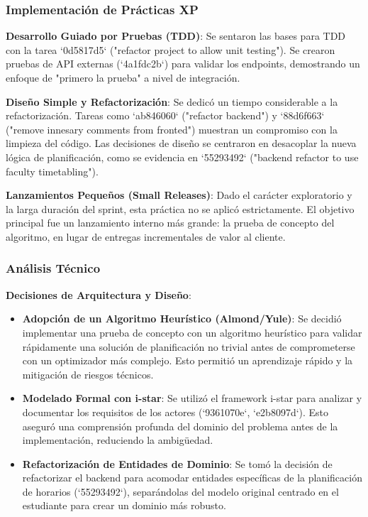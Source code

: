 \subsubsection{Implementación de Prácticas XP}

\textbf{Desarrollo Guiado por Pruebas (TDD)}:
Se sentaron las bases para TDD con la tarea `0d5817d5` ("refactor project to allow unit testing"). Se crearon pruebas de API externas (`4a1fdc2b`) para validar los endpoints, demostrando un enfoque de "primero la prueba" a nivel de integración.

\textbf{Diseño Simple y Refactorización}:
Se dedicó un tiempo considerable a la refactorización. Tareas como `ab846060` ("refactor backend") y `88d6f663` ("remove innesary comments from fronted") muestran un compromiso con la limpieza del código. Las decisiones de diseño se centraron en desacoplar la nueva lógica de planificación, como se evidencia en `55293492` ("backend refactor to use faculty timetabling").

\textbf{Lanzamientos Pequeños (Small Releases)}:
Dado el carácter exploratorio y la larga duración del sprint, esta práctica no se aplicó estrictamente. El objetivo principal fue un lanzamiento interno más grande: la prueba de concepto del algoritmo, en lugar de entregas incrementales de valor al cliente.

\subsubsection{Análisis Técnico}

\textbf{Decisiones de Arquitectura y Diseño}:
\begin{itemize}
    \item \textbf{Adopción de un Algoritmo Heurístico (Almond/Yule)}: Se decidió implementar una prueba de concepto con un algoritmo heurístico para validar rápidamente una solución de planificación no trivial antes de comprometerse con un optimizador más complejo. Esto permitió un aprendizaje rápido y la mitigación de riesgos técnicos.
    \item \textbf{Modelado Formal con i-star}: Se utilizó el framework i-star para analizar y documentar los requisitos de los actores (`9361070e`, `e2b8097d`). Esto aseguró una comprensión profunda del dominio del problema antes de la implementación, reduciendo la ambigüedad.
    \item \textbf{Refactorización de Entidades de Dominio}: Se tomó la decisión de refactorizar el backend para acomodar entidades específicas de la planificación de horarios (`55293492`), separándolas del modelo original centrado en el estudiante para crear un dominio más robusto.
\end{itemize}

